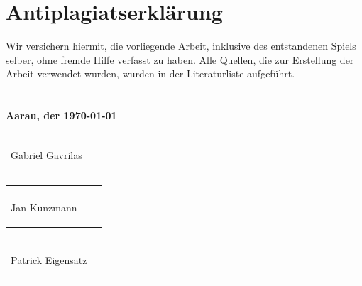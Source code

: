 \documentclass[11pt,a4paper]{scrbook}
\begin{document}
\clearpage

\chapter*{Antiplagiatserklärung}
Wir versichern hiermit, die vorliegende Arbeit, inklusive des entstandenen Spiels
selber, ohne fremde Hilfe verfasst zu haben. Alle Quellen, die zur Erstellung
der Arbeit verwendet wurden, wurden in der Literaturliste aufgeführt.
\\\\\\
\textbf{Aarau, der \today}\\

\vspace{1 cm} 
\begin{tabular}{p{5cm}p{.5cm}l}
\dotfill \\ 
\begin{center}
Gabriel Gavrilas

\end{center}\end{tabular}%
\hfill 
\begin{tabular}{p{5cm}p{.5cm}l}
\dotfill \\ 
\begin{center}
Jan Kunzmann

\end{center}\end{tabular}%
\hfill 
\begin{tabular}{p{5cm}p{.5cm}l}
\dotfill \\ 
\begin{center}
Patrick Eigensatz
\end{center}
\end{tabular}%
  
\end{document}
